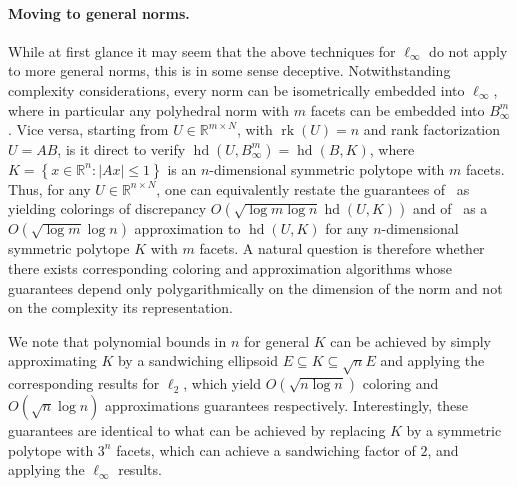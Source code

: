 \documentclass[11pt]{article}
\newcommand{\R}{{\mathbb{R}}}
\newcommand{\set}[1]{\left\{ #1 \right\}}
\DeclareMathOperator{\hd}{hd}
\DeclareMathOperator{\rank}{rk}
\begin{document}
\paragraph{\bf Moving to general norms.} While at first glance it may seem that
the above techniques for $\ell_\infty$ do not apply to more general norms, this
is in some sense deceptive. Notwithstanding complexity considerations, every
norm can be isometrically embedded into $\ell_\infty$, where in particular any
polyhedral norm with $m$ facets can be embedded into $B^m_\infty$. Vice versa,
starting from $U \in \R^{m \times N}$, with $\rank(U) = n$ and rank
factorization $U = A B$, is it direct to verify $\hd(U,B^m_\infty) = \hd(B,K)$,
where $K = \set{x \in \R^n: |Ax| \leq 1}$ is an $n$-dimensional symmetric
polytope with $m$ facets. Thus, for any $U \in \R^{n \times N}$, one can
equivalently restate the guarantees of~\cite{Bansal10} as yielding colorings of
discrepancy $O(\sqrt{\log m \log n} \hd(U,K))$ and of~\cite{disc-gamma2} as a
$O(\sqrt{\log m}\log n)$ approximation to $\hd(U,K)$ for any $n$-dimensional
symmetric polytope $K$ with $m$ facets. A natural question is therefore
whether there exists corresponding coloring and approximation algorithms whose
guarantees depend only polygarithmically on the dimension of the norm and not on
the complexity its representation. 

We note that polynomial bounds in $n$ for general $K$ can be achieved by simply
approximating $K$ by a sandwiching ellipsoid $E \subseteq K \subseteq \sqrt{n}
E$ and applying the corresponding results for $\ell_2$, which yield $O(\sqrt{n
\log n})$ coloring and $O(\sqrt{n}\log n)$ approximations guarantees
respectively. Interestingly, these guarantees are identical to what can be
achieved by replacing $K$ by a symmetric polytope with $3^n$ facets, which can
achieve a sandwiching factor of $2$, and applying the $\ell_\infty$ results.
\end{document}
